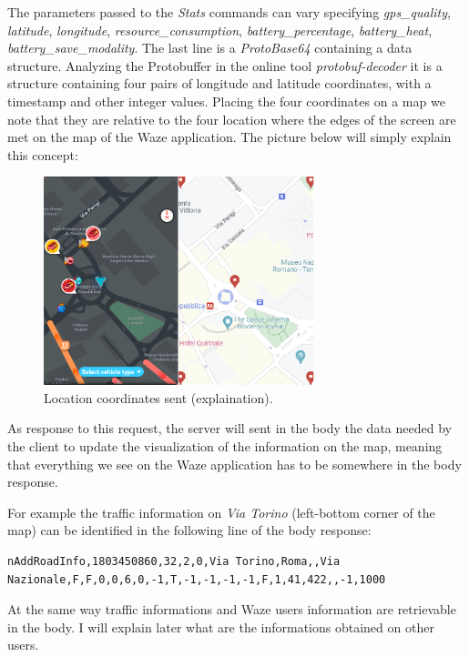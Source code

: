 			The parameters passed to the \textit{Stats} commands can vary specifying \textit{gps\_quality}, \textit{latitude}, \textit{longitude}, \textit{resource\_consumption}, \textit{battery\_percentage}, \textit{battery\_heat}, \textit{battery\_save\_modality}.
			The last line is a \textit{ProtoBase64} containing a data structure. Analyzing the Protobuffer in the online tool \textit{protobuf-decoder} it is a structure containing four pairs of longitude and latitude coordinates, with a timestamp and other integer values. Placing the four coordinates on a map we note that they are relative to the four location where the edges of the screen are met on the map of the Waze application. The picture below will simply explain this concept:
			\begin{figure}[H]
				\centering
				\includegraphics[width=0.7\textwidth]{images/waze_idle4pointsapp.png}
				\caption{Location coordinates sent (explaination).}
			\end{figure}
			As response to this request, the server will sent in the body the data needed by the client to update the visualization of the information on the map, meaning that everything we see on the Waze application has to be somewhere in the body response.\newline
			\par For example the traffic information on \textit{Via Torino} (left-bottom corner of the map) can be identified in the following line of the body response:
			\begin{lstlisting}
nAddRoadInfo,1803450860,32,2,0,Via Torino,Roma,,Via Nazionale,F,F,0,0,6,0,-1,T,-1,-1,-1,-1,F,1,41,422,,-1,1000
			\end{lstlisting}
			At the same way traffic informations and Waze users information are retrievable in the body. I will explain later what are the informations obtained on other users.
			
